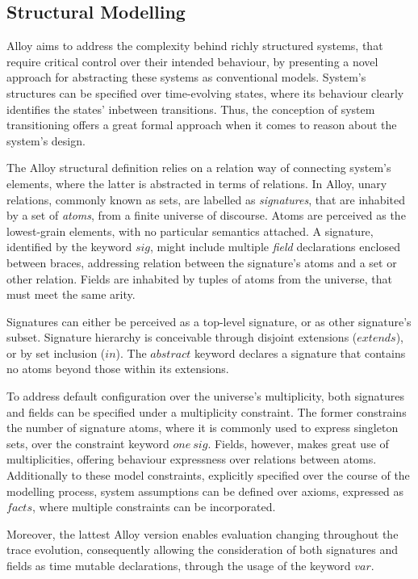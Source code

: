 \subsection{Structural Modelling}\label{c:alloy-sm}

Alloy aims to address the complexity behind richly structured systems, that require critical control over their intended behaviour, by presenting a novel approach for abstracting these systems as conventional models. System's structures can be specified over time-evolving states, where its behaviour clearly identifies the states' inbetween transitions. Thus, the conception of system transitioning offers a great formal approach when it comes to reason about the system's design.

The Alloy structural definition relies on a relation way of connecting system's elements, where the latter is abstracted in terms of relations. In Alloy, unary relations, commonly known as sets, are labelled as \textit{signatures}, that are inhabited by a set of \textit{atoms}, from a finite universe of discourse. Atoms are perceived as the lowest-grain elements, with no particular semantics attached. A signature, identified by the keyword $sig$, might include multiple \textit{field} declarations enclosed between braces, addressing relation between the signature's atoms and a set or other relation. Fields are inhabited by tuples of atoms from the universe, that must meet the same arity.

Signatures can either be perceived as a top-level signature, or as other signature's subset. Signature hierarchy is conceivable through disjoint extensions ($extends$), or by set inclusion ($in$). The $abstract$ keyword declares a signature that contains no atoms beyond those within its extensions. 

To address default configuration over the universe's multiplicity, both signatures and fields can be specified under a multiplicity constraint. The former constrains the number of signature atoms, where it is commonly used to express singleton sets, over the constraint keyword $one\ sig$. Fields, however, makes great use of multiplicities, offering behaviour expressness over relations between atoms. Additionally to these model constraints, explicitly specified over the course of the modelling process, system assumptions can be defined over axioms, expressed as $facts$, where multiple constraints can be incorporated. \cite{gheyi2007formally}

Moreover, the lattest Alloy version enables evaluation changing throughout the trace evolution, consequently allowing the consideration of both signatures and fields as time mutable declarations, through the usage of the keyword $var$.

